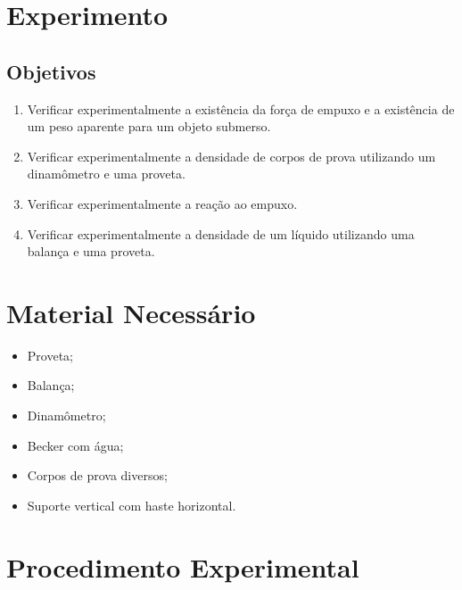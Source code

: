 \section{Experimento}

\subsection{Objetivos}
\label{Sec:ObjetivosEmpuxo}

\begin{enumerate}
	\item Verificar experimentalmente a existência da força de empuxo e a existência de um peso aparente para um objeto submerso.
	\item Verificar experimentalmente a densidade de corpos de prova utilizando um dinamômetro e uma proveta.
	\item Verificar experimentalmente a reação ao empuxo.
	\item Verificar experimentalmente a densidade de um líquido utilizando uma balança e uma proveta.
\end{enumerate}

\section{Material Necessário}

\begin{itemize}
	\item Proveta;
	\item Balança;
	\item Dinamômetro;
	\item Becker com água;
	\item Corpos de prova diversos;
	\item Suporte vertical com haste horizontal.
\end{itemize}

\section{Procedimento Experimental}

